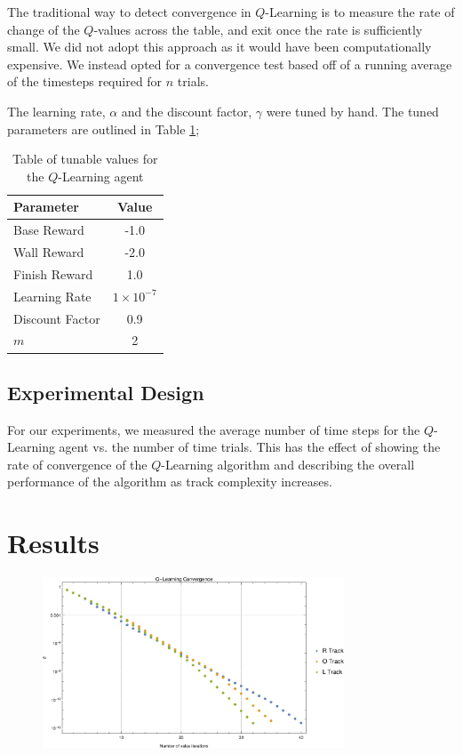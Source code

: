 \documentclass{article}
\begin{document}
			The traditional way to detect convergence in $Q$-Learning is to measure the rate of change of the $Q$-values across the table, and exit once the rate is sufficiently small. We did not adopt this approach as it would have been computationally expensive. We instead opted for a convergence test based off of a running average of the timesteps required for $n$ trials.
			
			The learning rate, $\alpha$ and the discount factor, $\gamma$ were tuned by hand. The tuned parameters are outlined in Table \ref{Q_params};
			
			\begin{table}
				\centering
				\begin{tabular}{|l|c|}
					\hline
					Parameter & Value \\ \hline
					Base Reward & -1.0 \\ 
					Wall Reward & -2.0 \\
					Finish Reward & 1.0 \\
					Learning Rate & $1 \times 10^{-7}$ \\
					Discount Factor & 0.9 \\
					$m$ & 2 \\ \hline
				\end{tabular}
				\caption{Table of tunable values for the $Q$-Learning agent}
				\label{Q_params}
			\end{table}
		\subsection{Experimental Design}
		
			For our experiments, we measured the average number of time steps for the $Q$-Learning agent vs. the number of time trials. This has the effect of showing the rate of convergence of the $Q$-Learning algorithm and describing the overall performance of the algorithm as track complexity increases.
		
	\section{Results}		
				\begin{figure}[h!]
					\centering
					\includegraphics[width=0.8\textwidth]{Diagrams/VIter}
					\caption{}
					\label{VIter}
				\end{figure}
				
\end{document}
